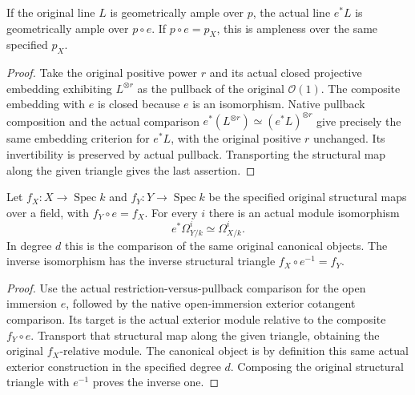 \begin{lemma}
\label{lem:kn-scheme-iso-ample-pullback}
\leanok
{}
If the original line $L$ is geometrically ample over $p$, the actual
line $e^*L$ is geometrically ample over $p\circ e$.
If $p\circ e=p_X$, this is ampleness over the same specified $p_X$.
\end{lemma}
\begin{proof}
Take the original positive power $r$ and its actual closed projective
embedding exhibiting $L^{\otimes r}$ as the pullback of the original
$\mathcal O(1)$.  The composite embedding with $e$ is closed because
$e$ is an isomorphism.  Native pullback composition and the actual
comparison $e^*(L^{\otimes r})\simeq(e^*L)^{\otimes r}$ give precisely
the same embedding criterion for $e^*L$, with the original positive
$r$ unchanged.  Its invertibility is preserved by actual pullback.
Transporting the structural map along the given triangle gives the
last assertion.
\end{proof}

\begin{lemma}
\label{lem:kn-scheme-iso-exterior-pullback}
\leanok
{}
Let $f_X:X\to\operatorname{Spec}k$ and $f_Y:Y\to\operatorname{Spec}k$
be the specified original structural maps over a field, with
$f_Y\circ e=f_X$.  For every $i$ there is an actual module isomorphism
\[
 e^*\Omega^i_{Y/k}\simeq\Omega^i_{X/k}.
\]
In degree $d$ this is the comparison of the same original canonical
objects.  The inverse isomorphism has the inverse structural triangle
$f_X\circ e^{-1}=f_Y$.
\end{lemma}
\begin{proof}
Use the actual restriction-versus-pullback comparison for the open
immersion $e$, followed by the native open-immersion exterior
cotangent comparison.  Its target is the actual exterior module
relative to the composite $f_Y\circ e$.  Transport that structural map
along the given triangle, obtaining the original $f_X$-relative
module.  The canonical object is by definition this same actual
exterior construction in the specified degree $d$.  Composing the
original structural triangle with $e^{-1}$ proves the inverse one.
\end{proof}

